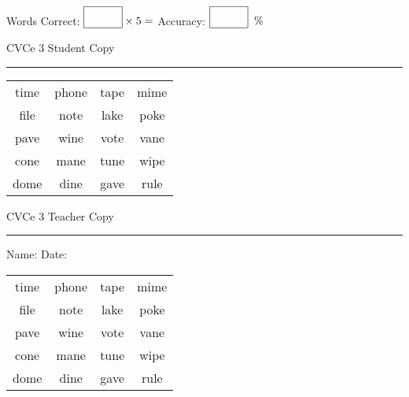 \documentclass{memoir}
\begin{document}
\small

Words Correct: $\fbox{\phantom{\huge 100}} \times 5 = $ Accuracy: $\fbox{\phantom{\huge 100}}\;\; \%$ 

\vfill

\newpage


\footnotesize \noindent
CVCe 3 \hfill Student Copy
\smallskip
\hrule

\Large

\setlength{\tabcolsep}{14pt}
\def\arraystretch{2}

{\selectfont


\begin{vplace}[0.5]
\begin{center}
\begin{tabular}{cccc}
time & phone & tape & mime \\
file & note & lake & poke \\
pave & wine & vote & vane \\
cone & mane & tune & wipe \\
dome & dine & gave & rule \\
\end{tabular}
\end{center}
\end{vplace}

}

\newpage

\footnotesize \noindent
CVCe 3 \hfill Teacher Copy
\smallskip
\hrule

\small

\vfill

\noindent
Name: \underline{\hspace{1.75in}} \hfill Date: \underline{\hspace{1in}}

\Large

{\selectfont


\begin{vplace}[0.5]
\begin{center}
\begin{tabular}{cccc}
time & phone & tape & mime \\
file & note & lake & poke \\
pave & wine & vote & vane \\
cone & mane & tune & wipe \\
dome & dine & gave & rule \\
\end{tabular}
\end{center}
\end{vplace}



}
\end{document}
